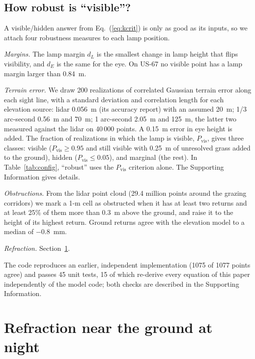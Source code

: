 \documentclass[aip,jap,amsmath,amssymb,reprint,floatfix]{revtex4-2}
\begin{document}
\subsection{How robust is ``visible''?}

A visible/hidden answer from Eq.~(\ref{eq:kcrit}) is only as good as its inputs, so we attach four robustness measures to each lamp position.

\textit{Margins.} The lamp margin $d_L$ is the smallest change in lamp height that flips visibility, and $d_E$ is the same for the eye. On US-67 no visible point has a lamp margin larger than 0.84~m.

\textit{Terrain error.} We draw 200 realizations of correlated Gaussian terrain error along each sight line, with a standard deviation and correlation length for each elevation source: lidar 0.056~m (its accuracy report) with an assumed 20~m; 1/3 arc-second 0.56~m and 70~m; 1 arc-second 2.05~m and 125~m, the latter two measured against the lidar on 40\,000 points. A 0.15~m error in eye height is added. The fraction of realizations in which the lamp is visible, $P_{\mathrm{vis}}$, gives three classes: visible ($P_{\mathrm{vis}}\ge0.95$ and still visible with 0.25~m of unresolved grass added to the ground), hidden ($P_{\mathrm{vis}}\le0.05$), and marginal (the rest). In Table~\ref{tab:config}, ``robust'' uses the $P_{\mathrm{vis}}$ criterion alone. The Supporting Information gives details.\cite{SM}

\textit{Obstructions.} From the lidar point cloud (29.4 million points around the grazing corridors) we mark a 1-m cell as obstructed when it has at least two returns and at least 25\% of them more than 0.3~m above the ground, and raise it to the height of its highest return. Ground returns agree with the elevation model to a median of $-0.8$~mm.

\textit{Refraction.} Section~\ref{sec:refraction}.

The code reproduces an earlier, independent implementation (1075 of 1077 points agree) and passes 45 unit tests, 15 of which re-derive every equation of this paper independently of the model code; both checks are described in the Supporting Information.\cite{SM}

\section{Refraction near the ground at night}\label{sec:refraction}
\end{document}
